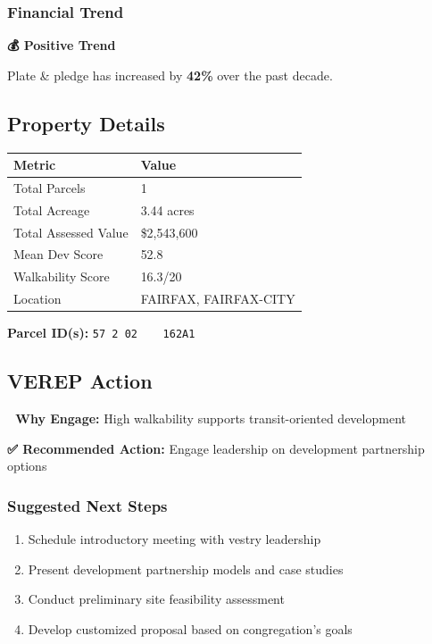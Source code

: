 \documentclass[
  letterpaper,
  DIV=11,
  numbers=noendperiod,
  oneside]{scrreprt}
\providecommand{\tightlist}{%
  \setlength{\itemsep}{0pt}\setlength{\parskip}{0pt}}
\begin{document}
\subsubsection{Financial Trend}\label{financial-trend-7}

\textbf{💰 Positive Trend}

Plate \& pledge has increased by \textbf{42\%} over the past decade.

\subsection{Property Details}

\begin{longtable}[]{@{}ll@{}}
\toprule\noalign{}
Metric & Value \\
\midrule\noalign{}
\endhead
\bottomrule\noalign{}
\endlastfoot
Total Parcels & 1 \\
Total Acreage & 3.44 acres \\
Total Assessed Value & \$2,543,600 \\
Mean Dev Score & 52.8 \\
Walkability Score & 16.3/20 \\
Location & FAIRFAX, FAIRFAX-CITY \\
\end{longtable}

\textbf{Parcel ID(s):} \texttt{57\ 2\ 02\ \ \ \ 162A1}

\subsection{VEREP Action}

\textbf{🎯 Why Engage:} High walkability supports transit-oriented
development

\textbf{✅ Recommended Action:} Engage leadership on development
partnership options

\subsubsection{Suggested Next Steps}\label{suggested-next-steps-7}

\begin{enumerate}
\def\labelenumi{\arabic{enumi}.}
\tightlist
\item
  Schedule introductory meeting with vestry leadership
\item
  Present development partnership models and case studies
\item
  Conduct preliminary site feasibility assessment
\item
  Develop customized proposal based on congregation's goals
\end{enumerate}
\end{document}
